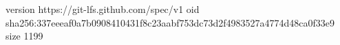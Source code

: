 version https://git-lfs.github.com/spec/v1
oid sha256:337eeeaf0a7b0908410431f8c23aabf753dc73d2f4983527a4774d48ca0f33e9
size 1199
